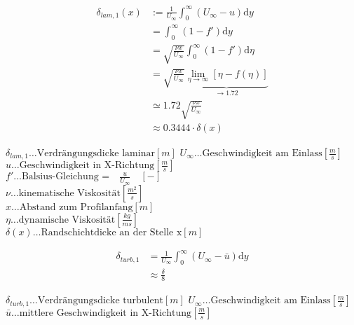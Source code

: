 \begin{align}
\delta_{lam,1}(x) &:=\frac{1}{U_{\infty}}\int^\infty_0\left(U_\infty-u\right)\text{d}y \nonumber\\
        &=\int^\infty_0\left(1-f'\right)\text{d}y\nonumber\\
        &=\sqrt{\frac{\nu x}{U_\infty}}\int^\infty_0\left(1-f'\right)\text{d}\eta\nonumber\\
        &=\sqrt{\frac{\nu x}{U_\infty}}\underbrace{\lim\limits_{\eta \rightarrow \infty}{\left[\eta-f(\eta)\right]}}_{\rightarrow 1.72}\nonumber\\
        &\simeq 1.72\sqrt{\frac{\nu x}{U_\infty}}\nonumber\\
        &\approx0.3444\cdot\delta(x)
\label{eq:verdraengungsdicke_laminar}
\end{align}
\begin{center}
\begin{minipage}{0.5\linewidth}
$\delta_{lam,1} \dots \text{Verdrängungsdicke laminar} \left[m\right]$
$U_{\infty} \dots \text{Geschwindigkeit am Einlass} \left[\frac{m}{s}\right]$\\
$u \dots \text{Geschwindigkeit in X-Richtung} \left[\frac{m}{s}\right]$\\
$f' \dots \text{Balsius-Gleichung =}\quad\frac{u}{U_{\infty}} \quad \left[-\right]$\\
$\nu \dots \text{kinematische Viskosität} \left[\frac{m^2}{s}\right]$ \\
$x \dots \text{Abstand zum Profilanfang} \left[m\right]$ \\
$\eta \dots \text{dynamische Viskosität} \left[\frac{kg}{ms}\right]$ \\
$\delta(x) \dots \text{Randschichtdicke an der Stelle x} \left[m\right]$\\
\end{minipage}
\end{center}

\begin{align}
\delta_{turb,1} &=\frac{1}{U_{\infty}}\int^\infty_0\left(U_\infty-\bar{u}\right)\text{d}y \nonumber\\
        &\approx \frac{\delta}{8}
\label{eq:verdraenungsdicke_turbulent}
\end{align}
\begin{center}
\begin{minipage}{0.5\linewidth}
$\delta_{turb,1} \dots \text{Verdrängungsdicke turbulent} \left[m\right]$
$U_{\infty} \dots \text{Geschwindigkeit am Einlass} \left[\frac{m}{s}\right]$\\
$\bar{u} \dots \text{mittlere Geschwindigkeit in X-Richtung} \left[\frac{m}{s}\right]$ \\
\end{minipage}
\end{center}
 

